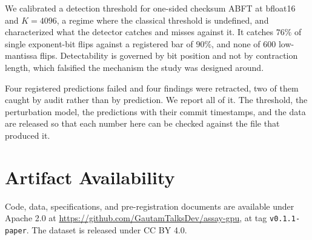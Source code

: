 \documentclass[11pt]{article}
\begin{document}
We calibrated a detection threshold for one-sided checksum ABFT at bfloat16
and $K = 4096$, a regime where the classical threshold is undefined, and
characterized what the detector catches and misses against it. It catches
$76\%$ of single exponent-bit flips against a registered bar of $90\%$, and
none of $600$ low-mantissa flips. Detectability is governed by bit position and
not by contraction length, which falsified the mechanism the study was designed
around.

Four registered predictions failed and four findings were retracted, two of
them caught by audit rather than by prediction. We report all of it. The
threshold, the perturbation model, the predictions with their commit
timestamps, and the data are released so that each number here can be checked
against the file that produced it.

\section*{Artifact Availability}

Code, data, specifications, and pre-registration documents are available under
Apache 2.0 at \url{https://github.com/GautamTalksDev/assay-gpu}, at tag \texttt{v0.1.1-paper}. The dataset is released under CC BY 4.0.



\end{document}
